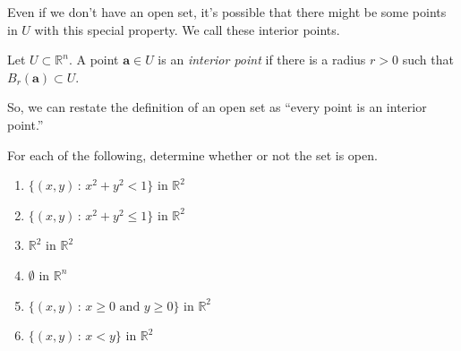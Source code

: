 \documentclass{ximera}
\begin{document}

Even if we don't have an open set, it's possible that there might be some points in $U$ with this special property. We call these interior points.

\begin{definition}
Let $U\subset \mathbb{R}^n$. A point $\mathbf{a}\in U$ is an \emph{interior point} if there is a radius $r>0$ such that $B_r(\mathbf{a})\subset U$.
\end{definition}

So, we can restate the definition of an open set as ``every point is an interior point.''

\begin{problem}

For each of the following, determine whether or not the set is open.

\begin{enumerate}
\item $\{(x,y)\,:\,x^2+y^2<1\}$ in $\mathbb{R}^2$
\begin{multipleChoice}
\end{multipleChoice}			%
\item $\{(x,y)\,:\,x^2+y^2\leq 1\}$ in $\mathbb{R}^2$
\begin{multipleChoice}
\end{multipleChoice}			%
\item $\mathbb{R}^2$ in $\mathbb{R}^2$
\begin{multipleChoice}
\end{multipleChoice}			%
\item $\emptyset$ in $\mathbb{R}^n$
\begin{multipleChoice}
\end{multipleChoice}			%
\item $\{(x,y)\,:\,x\geq 0\textrm{ and }y\geq 0\}$ in $\mathbb{R}^2$
\begin{multipleChoice}
\end{multipleChoice}			%
\item $\{(x,y)\,:\,x<y\}$ in $\mathbb{R}^2$
\begin{multipleChoice}
\end{multipleChoice}			%
\end{enumerate}

\end{problem}
\end{document}
